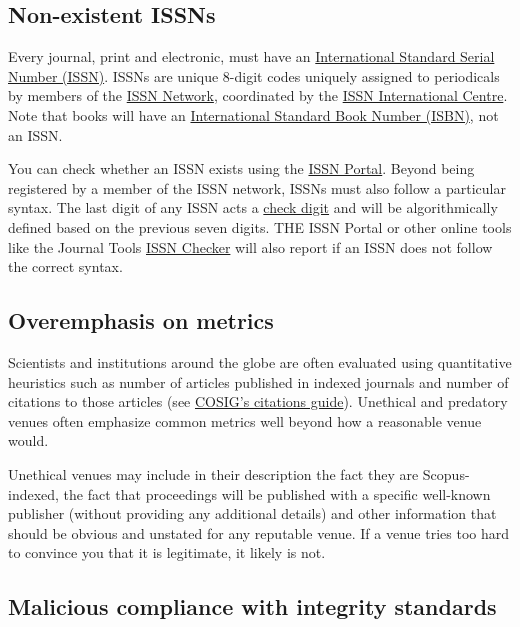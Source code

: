 \documentclass[letterpaper, 12pt]{article}
\begin{document}
\subsection*{Non-existent ISSNs}

Every journal, print and electronic, must have an \href{https://www.issn.org/understanding-the-issn/what-is-an-issn/}{International Standard Serial Number (ISSN)}. ISSNs are unique 8-digit codes uniquely assigned to periodicals by members of the \href{https://www.issn.org/the-centre-and-the-network/our-organization/le-reseau-issn-en/}{ISSN Network}, coordinated by the \href{https://portal.issn.org/}{ISSN International Centre}. Note that books will have an \href{https://en.wikipedia.org/wiki/ISBN}{International Standard Book Number (ISBN)}, not an ISSN.

You can check whether an ISSN exists using the \href{https://portal.issn.org/}{ISSN Portal}. Beyond being registered by a member of the ISSN network, ISSNs must also follow a particular syntax. The last digit of any ISSN acts a \href{https://en.wikipedia.org/wiki/Check_digit}{check digit} and will be algorithmically defined based on the previous seven digits. THE ISSN Portal or other online tools like the Journal Tools \href{https://journaltoolkit.com/tools/issn-checker}{ISSN Checker} will also report if an ISSN does not follow the correct syntax.

\subsection*{Overemphasis on metrics}

Scientists and institutions around the globe are often evaluated using quantitative heuristics such as number of articles published in indexed journals and number of citations to those articles (see \href{https://osf.io/5vknq}{COSIG's citations guide}). Unethical and predatory venues often emphasize common metrics well beyond how a reasonable venue would.

Unethical venues may include in their description the fact they are Scopus-indexed,
the fact that proceedings will be published with a specific well-known publisher (without providing any additional details)
and other information that should be obvious and unstated for any reputable venue.
If a venue tries too hard to convince you that it is legitimate, it likely is not.

\subsection*{Malicious compliance with integrity standards}
\end{document}
